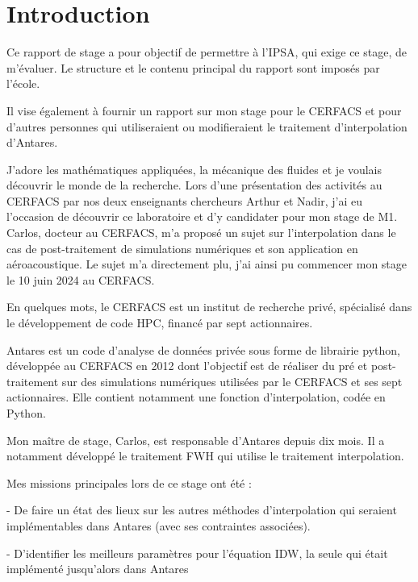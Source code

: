 \section*{Introduction}

Ce rapport de stage a pour objectif de permettre à l'IPSA, qui exige ce stage, de m'évaluer. Le structure et le contenu principal du rapport sont imposés par l'école.

Il vise également à fournir un rapport sur mon stage pour le CERFACS et pour d'autres personnes qui utiliseraient ou modifieraient le traitement d'interpolation d'Antares.

\vspace{0.5cm}

J'adore les mathématiques appliquées, la mécanique des fluides et je voulais découvrir le monde de la recherche. Lors d'une présentation des activités au \ac{CERFACS} par nos deux enseignants chercheurs Arthur et Nadir, j'ai eu l'occasion de découvrir ce laboratoire et d'y candidater pour mon stage de M1. Carlos, docteur au CERFACS, m'a proposé un sujet sur l'interpolation dans le cas de post-traitement de simulations numériques et son application en aéroacoustique. Le sujet m'a directement plu, j'ai ainsi pu commencer mon stage le 10 juin 2024 au CERFACS.

En quelques mots, le CERFACS est un institut de recherche privé, spécialisé dans le développement de code \ac{HPC}, financé par sept actionnaires.

Antares\cite{antares} est un code d’analyse de données privée sous forme de librairie python, développée au CERFACS en 2012 dont l'objectif est de réaliser du pré et post-traitement sur des simulations numériques utilisées par le CERFACS et ses sept actionnaires.
Elle contient notamment une fonction d'interpolation, codée en Python.

Mon maître de stage, Carlos, est responsable d'Antares depuis dix mois. Il a notamment développé le traitement \ac{FWH} qui utilise le traitement interpolation.

Mes missions principales lors de ce stage ont été :

- De faire un état des lieux sur les autres méthodes d'interpolation qui seraient 
implémentables dans Antares (avec ses contraintes associées).

- D'identifier les meilleurs paramètres pour l'équation \ac{IDW}, la seule qui était implémenté jusqu'alors dans Antares %

